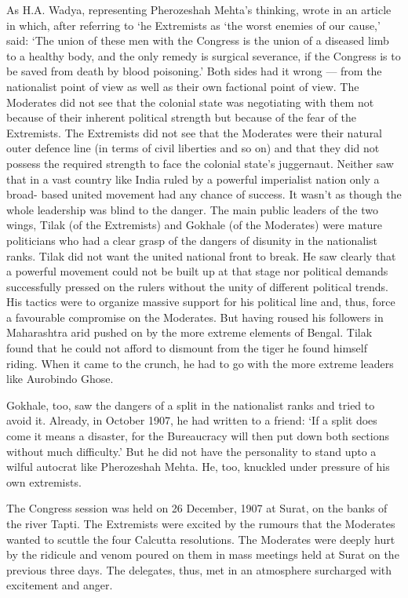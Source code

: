 As H.A. Wadya, representing Pherozeshah Mehta's thinking, wrote in an article in which, after referring to `he Extremists as `the worst enemies of our cause,' said: `The union of these men with the Congress is the union of a diseased limb to a healthy body, and the only remedy is surgical severance, if the Congress is to be saved from death by blood poisoning.' Both sides had it wrong — from the nationalist point of view as well as their own factional point of view. The Moderates did not see that the colonial state was negotiating with them not because of their inherent political strength but because of the fear of the Extremists. The Extremists did not see that the Moderates were their natural outer defence line (in terms of civil liberties and so on) and that they did not possess the required strength to face the colonial state's juggernaut. Neither saw that in a vast country like India ruled by a powerful imperialist nation only a broad- based united movement had any chance of success. It wasn't as though the whole leadership was blind to the danger. The main public leaders of the two wings, Tilak (of the Extremists) and Gokhale (of the Moderates) were mature politicians who had a clear grasp of the dangers of disunity in the nationalist ranks. Tilak did not want the united national front to break. He saw clearly that a powerful movement could not be built up at that stage nor political demands successfully pressed on the rulers without the unity of different political trends. His tactics were to organize massive support for his political line and, thus, force a favourable compromise on the Moderates. But having roused his followers in Maharashtra arid pushed on by the more extreme elements of Bengal. Tilak found that he could not afford to dismount from the tiger he found himself riding. When it came to the crunch, he had to go with the more extreme leaders like Aurobindo Ghose.

Gokhale, too, saw the dangers of a split in the nationalist ranks and tried to avoid it. Already, in October 1907, he had written to a friend: `If a split does come it means a disaster, for the Bureaucracy will then put down both sections without much difficulty.' But he did not have the personality to stand upto a wilful autocrat like Pherozeshah Mehta. He, too, knuckled under pressure of his own extremists.

The Congress session was held on 26 December, 1907 at Surat, on the banks of the river Tapti. The Extremists were excited by the rumours that the Moderates wanted to scuttle the four Calcutta resolutions. The Moderates were deeply hurt by the ridicule and venom poured on them in mass meetings held at Surat on the previous three days. The delegates, thus, met in an atmosphere surcharged with excitement and anger.


